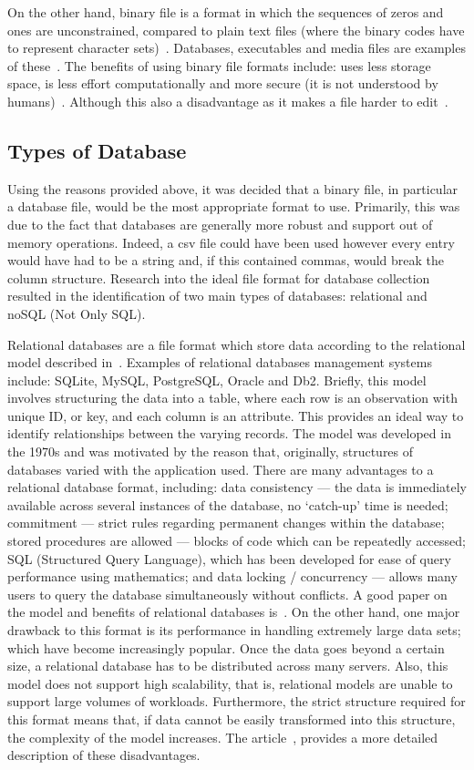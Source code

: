 On the other hand, binary file is a format in which the sequences of zeros and ones are
unconstrained, compared to plain text files (where the binary codes have to
represent character sets)~\cite{Spacey2017}. Databases, executables and media
files are examples of these~\cite{Spacey2017}. The benefits of using binary file formats
include: uses less storage space, is less effort computationally and more
secure (it is not understood by humans)~\cite{Azad}. Although this also a
disadvantage as it makes a file harder to edit~\cite{Azad}.

\subsection{Types of Database}\label{subsec:Types_of_DB}
Using the reasons provided above, it was decided that a binary file, in
particular a database file, would be
the most appropriate format to use. Primarily, this was due to the fact that
databases are generally more robust and support out of memory operations.
Indeed, a csv file could have been used however every entry would have had to be
a string and, if this contained commas, would break the column structure. Research into the ideal
file format for database collection resulted in the identification of two main
types of databases: relational and noSQL (Not Only SQL).

Relational databases are a file format which store data according to the
relational model described in~\cite{Codd2002}. Examples of relational
databases management systems include: SQLite, MySQL, PostgreSQL, Oracle and Db2.
Briefly, this model involves structuring the data into a table, where each
row is an observation with unique ID, or key, and each column is an
attribute. This provides an ideal way to identify relationships
between the varying records. The model was developed in the 1970s and was
motivated by the reason that, originally, structures of databases varied with the
application used. There are many advantages to a relational
database format, including: data consistency --- the data is immediately available
across several instances of the database, no `catch-up' time is needed; commitment
--- strict rules regarding permanent changes within the database;
stored procedures are allowed --- blocks of code which can be repeatedly accessed; SQL
(Structured Query Language), which has been developed for ease of query performance
using mathematics; and data
locking / concurrency --- allows many users to query the database
simultaneously without conflicts. A good paper on the model and benefits of
relational databases is~\cite{Oracle2020}. On the other hand, one major
drawback to this format is its performance in handling extremely large data
sets; which have become increasingly popular. Once the data goes beyond a
certain size, a relational database has to be distributed across many servers.
Also, this model does not support high scalability, that is, relational models
are unable to support large volumes of workloads. Furthermore, the strict structure
required for this format means that, if data cannot be easily transformed
into this structure, the complexity of the model increases. The
article~\cite{Jatana2012}, provides a more detailed description of these disadvantages. 

